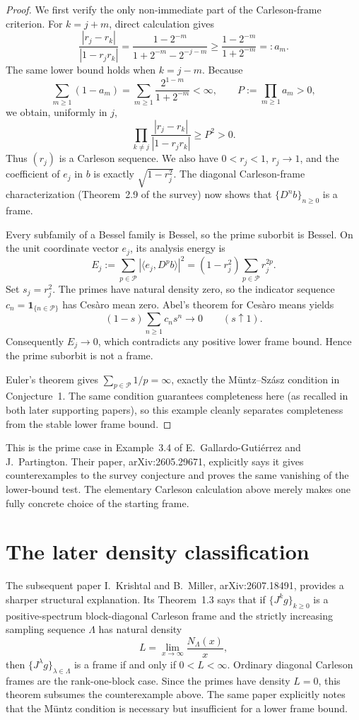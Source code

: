 \documentclass[11pt]{article}
\newcommand{\Pp}{\mathcal P}
\begin{document}
\begin{proof}
We first verify the only non-immediate part of the Carleson-frame criterion.
For \(k=j+m\), direct calculation gives
\[
 \frac{|r_j-r_k|}{|1-r_jr_k|}
 =\frac{1-2^{-m}}{1+2^{-m}-2^{-j-m}}
 \geq \frac{1-2^{-m}}{1+2^{-m}}=:a_m.
\]
The same lower bound holds when \(k=j-m\).  Because
\[
 \sum_{m\geq1}(1-a_m)
 =\sum_{m\geq1}\frac{2^{1-m}}{1+2^{-m}}<\infty,
 \qquad P:=\prod_{m\geq1}a_m>0,
\]
we obtain, uniformly in \(j\),
\[
 \prod_{k\ne j}\frac{|r_j-r_k|}{|1-r_jr_k|}\geq P^2>0.
\]
Thus \((r_j)\) is a Carleson sequence.  We also have \(0<r_j<1\),
\(r_j\to1\), and the coefficient of \(e_j\) in \(b\) is exactly
\(\sqrt{1-r_j^2}\).  The diagonal Carleson-frame characterization
(Theorem~2.9 of the survey) now shows that \(\{D^n b\}_{n\geq0}\) is a
frame.

Every subfamily of a Bessel family is Bessel, so the prime suborbit is
Bessel.  On the unit coordinate vector \(e_j\), its analysis energy is
\[
 E_j:=\sum_{p\in\Pp}|\langle e_j,D^p b\rangle|^2
     =(1-r_j^2)\sum_{p\in\Pp}r_j^{2p}.
\]
Set \(s_j=r_j^2\).  The primes have natural density zero, so the indicator
sequence \(c_n=\mathbf 1_{\{n\in\Pp\}}\) has Ces\`aro mean zero.  Abel's
theorem for Ces\`aro means yields
\[
 (1-s)\sum_{n\geq1}c_ns^n\longrightarrow0\qquad(s\uparrow1).
\]
Consequently \(E_j\to0\), which contradicts any positive lower frame bound.
Hence the prime suborbit is not a frame.

Euler's theorem gives \(\sum_{p\in\Pp}1/p=\infty\), exactly the
M\"untz--Sz\'asz condition in Conjecture~1.  The same condition guarantees
completeness here (as recalled in both later supporting papers), so this
example cleanly separates completeness from the stable lower frame bound.
\end{proof}

This is the prime case in Example~3.4 of E.~Gallardo-Guti\'errez and
J.~Partington.  Their paper, arXiv:2605.29671, explicitly says it gives
counterexamples to the survey conjecture and proves the same vanishing of
the lower-bound test.  The elementary Carleson calculation above merely
makes one fully concrete choice of the starting frame.

\section{The later density classification}

The subsequent paper I.~Krishtal and B.~Miller, arXiv:2607.18491, provides
a sharper structural explanation.  Its Theorem~1.3 says that if
\(\{J^kg\}_{k\geq0}\) is a positive-spectrum block-diagonal Carleson frame
and the strictly increasing sampling sequence \(\Lambda\) has natural
density
\[
 L=\lim_{x\to\infty}\frac{N_\Lambda(x)}x,
\]
then \(\{J^\lambda g\}_{\lambda\in\Lambda}\) is a frame if and only if
\(0<L<\infty\).  Ordinary diagonal Carleson frames are the rank-one-block
case.  Since the primes have density \(L=0\), this theorem subsumes the
counterexample above.  The same paper explicitly notes that the M\"untz
condition is necessary but insufficient for a lower frame bound.
\end{document}
